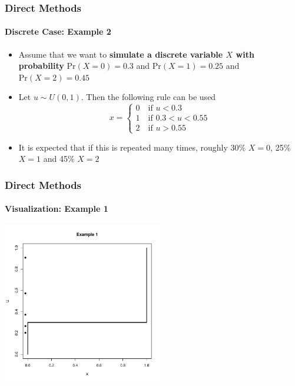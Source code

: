\documentclass[10pt]{beamer}
\begin{document}
       \begin{frame}
         \frametitle{Direct Methods}
         \framesubtitle{Discrete Case: Example 2}
         \begin{itemize}
         \item Assume that we want to \textbf{simulate a discrete variable $X$ with probability}
           $\mbox{Pr}(X=0)=0.3$ and $\mbox{Pr}(X=1)=0.25$ and $\mbox{Pr}(X=2)=0.45$

         \item Let $u\sim U(0,1)$.  Then the following rule can be used
           \begin{equation}
             x=\left\{\begin{array}{l}
                        0 \quad \mbox{if $u<0.3$}\\
                        1 \quad \mbox{if $0.3<u<0.55$}\\
                        2 \quad \mbox{if $u>0.55$}
                      \end{array}
                    \right.
                  \end{equation}

                \item It is expected that if this is repeated many times, roughly 30\% $X=0$, 25\% $X=1$ and  45\% $X=2$
                \end{itemize}
              \end{frame}


              \begin{frame}
                \frametitle{Direct Methods}
                \framesubtitle{Visualization: Example 1}
                \begin{center}
                  \includegraphics[height=7cm]{./Pics/d1p1.pdf}
                \end{center}
              \end{frame}
\end{document}
